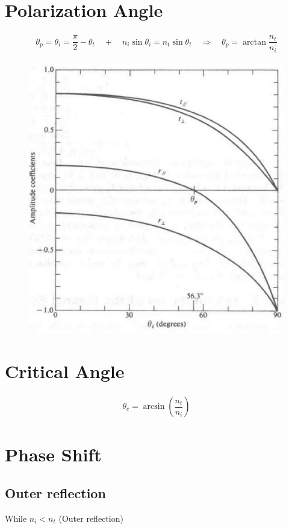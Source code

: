 \section{Polarization Angle}

\begin{equation*}
  \begin{aligned}
    \theta_p = \theta_i = \dfrac{\pi}{2} - \theta_t \quad + \quad  n_i \sin \theta_i = n_t \sin \theta_t \quad \Rightarrow \quad \theta_p = \arctan \dfrac{n_t}{n_i} 
  \end{aligned}
\end{equation*}

\begin{figure}[H]
  \centering
  \includegraphics[width=0.5\linewidth]{figures/Polarization-angle}
\end{figure}

\section{Critical Angle}

\begin{equation*}
  \begin{aligned}
    \theta_c = \arcsin \left( \dfrac{n_t}{n_i}  \right)
  \end{aligned}
\end{equation*}

\section{Phase Shift}

\subsection{Outer reflection}

While $n_i < n_t$ (Outer reflection)

